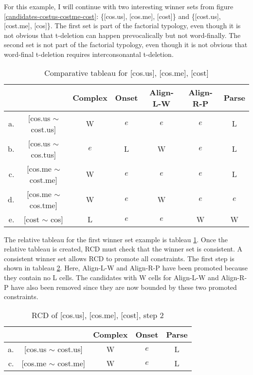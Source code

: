 \documentclass[11pt]{article}
\begin{document}
For this example, I will continue with two interesting winner sets from figure
\ref{candidates-costus-costme-cost}: \{[cos.us], [cos.me], [cost]\}
and \{[cost.us], [cost.me], [cos]\}. The first set is part of the
factorial typology, even though it is not obvious that t-deletion can
happen prevocalically but not word-finally. The second set is not
part of the factorial typology, even though it is not obvious that
word-final t-deletion requires interconsonantal t-deletion.

\begin{table}
\begin{tabular}{|rc||c|c|c|c|c|}\hline
 && {\sc *Complex} & {\sc Onset} & {\sc Align-L-W} & {\sc Align-R-P} & {\sc Parse} \\ \hline\hline
 a. & [cos.us $\sim$ cost.us] & W & $e$ &$e$  &$e$  & L\\ \hline
 b. & [cos.us $\sim$ cos.tus] &$e$ &L & W &$e$ &L\\ \hline
 c. & [cos.me $\sim$ cost.me] & W&$e$ &$e$ & $e$& L\\ \hline
 d. & [cos.me $\sim$ cos.tme] & W&$e$& W  &$e$&$e$\\ \hline
 e. & [cost $\sim$ cos]            &L &$e$ &$e$&W   & W \\ \hline
\end{tabular}
  \caption{Comparative tableau for [cos.us], [cos.me], [cost]}
  \label{tableau-cmp-cosus-cosme-cost}
\end{table}

The relative tableau for the first winner set example is tableau
\ref{tableau-cmp-cosus-cosme-cost}. Once the relative tableau is created,
RCD must check that the winner set is
consistent. A consistent winner set allows RCD to promote all
constraints. The first step is shown in tableau
\ref{tableau-cmp-cosus-cosme-cost2}. Here, {\sc Align-L-W} and {\sc
  Align-R-P} have been promoted because they contain no
L cells. The candidates with W cells for {\sc Align-L-W} and {\sc
  Align-R-P} have also been removed since they are now bounded by
these two promoted constraints.

\begin{table}
\begin{tabular}{|rc||c|c|c|}\hline
 && {\sc *Complex} & {\sc Onset} & {\sc Parse} \\ \hline\hline
 a. & [cos.us $\sim$ cost.us] & W & $e$ & L\\ \hline
 c. & [cos.me $\sim$ cost.me] & W&$e$ & L\\ \hline
\end{tabular}
  \caption{RCD of [cos.us], [cos.me], [cost], step 2}
  \label{tableau-cmp-cosus-cosme-cost2}
\end{table}
\end{document}
